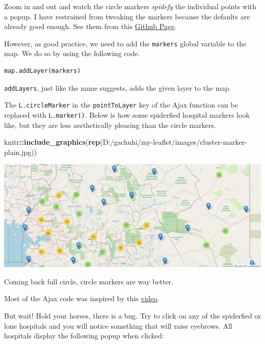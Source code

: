 \documentclass[
]{book}
\newenvironment{Shaded}{\begin{snugshade}}{\end{snugshade}}
\newcommand{\FunctionTok}[1]{\textcolor[rgb]{0.13,0.29,0.53}{\textbf{#1}}}
\newcommand{\NormalTok}[1]{#1}
\newcommand{\SpecialCharTok}[1]{\textcolor[rgb]{0.81,0.36,0.00}{\textbf{#1}}}
\newcommand{\StringTok}[1]{\textcolor[rgb]{0.31,0.60,0.02}{#1}}
\begin{document}
Zoom in and out and watch the circle markers \emph{spidefy} the individual points with a popup. I have restrained from tweaking the markers because the defaults are already good enough. See them from this \href{https://github.com/Leaflet/Leaflet.markercluster}{Github Page}.

However, as good practice, we need to add the \texttt{markers} global variable to the map. We do so by using the following code.

\begin{verbatim}
map.addLayer(markers)
\end{verbatim}

\texttt{addLayers}, just like the name suggests, adds the given layer to the map.

The \texttt{L.circleMarker} in the \texttt{pointToLayer} key of the Ajax function can be replaced with \texttt{L.marker()}. Below is how some spiderfied hospital markers look like, but they are less aesthetically pleasing than the circle markers.

\begin{Shaded}
\begin{Highlighting}[]
\NormalTok{knitr}\SpecialCharTok{::}\FunctionTok{include\_graphics}\NormalTok{(}\FunctionTok{rep}\NormalTok{(}\StringTok{\textquotesingle{}D:/gachuhi/my{-}leaflet/images/cluster{-}marker{-}plain.jpg\textquotesingle{}}\NormalTok{))}
\end{Highlighting}
\end{Shaded}

\includegraphics{../images/cluster-marker-plain.jpg}

Coming back full circle, circle markers are way better.

Most of the Ajax code was inspired by this \href{https://www.youtube.com/watch?v=R-V7XFUbrkw\&t=625s}{video}.

But wait! Hold your horses, there is a bug. Try to click on any of the spiderfied or lone hospitals and you will notice something that will raise eyebrows. All hospitals display the following popup when clicked:
\end{document}
